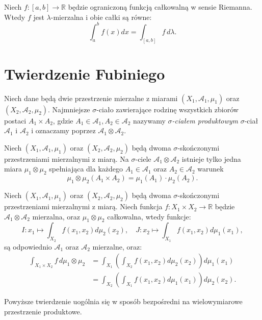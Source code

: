 	\begin{tw}
		Niech $f: [a,b] \rightarrow \mathbb{R}$ będzie ograniczoną funkcją całkowalną w sensie Riemanna. Wtedy $f$ jest $\lambda$-mierzalna i obie całki są równe:
		\begin{equation}
			\int_a^b f(x) dx = \int_{[a,b]}f \, d\lambda.
		\end{equation}
	\end{tw}
	\section{Twierdzenie Fubiniego}
	
	\begin{tw}
		Niech dane będą dwie przestrzenie mierzalne z miarami $(X_1, \mathcal{A}_1, \mu_1)$ oraz $(X_2, \mathcal{A}_2, \mu_2)$. Najmniejsze $\sigma$-ciało zawierające rodzinę wszystkich zbiorów postaci $A_1 \times A_2$, gdzie $A_1 \in \mathcal{A}_1, A_2 \in \mathcal{A}_2$ nazywamy \textit{$\sigma$-ciałem produktowym} $\sigma$-ciał $\mathcal{A}_1$ i $\mathcal{A}_2$ i  oznaczamy poprzez $\mathcal{A}_1 \otimes \mathcal{A}_2$.
	\end{tw}
	
	\begin{tw}
		Niech $(X_1, \mathcal{A}_1, \mu_1)$ oraz $(X_2, \mathcal{A}_2, \mu_2)$ będą dwoma $\sigma$-skończonymi przestrzeniami mierzalnymi z miarą. Na $\sigma$-ciele $\mathcal{A}_1 \otimes \mathcal{A}_2$ istnieje tylko jedna miara $\mu_1 \otimes \mu_2$ spełniająca dla każdego $A_1 \in \mathcal{A}_1$ oraz  $A_2 \in \mathcal{A}_2$ warunek
		\begin{equation}
			\mu_1 \otimes \mu_2(A_1 \times A_2) = \mu_1(A_1) \cdot \mu_2(A_2).
		\end{equation}
	\end{tw}
	
	\begin{tw}
		Niech $(X_1, \mathcal{A}_1, \mu_1)$ oraz $(X_2, \mathcal{A}_2, \mu_2)$ będą dwoma $\sigma$-skończonymi przestrzeniami mierzalnymi z miarą. Niech funkcja $f: X_1 \times X_2 \rightarrow \mathbb{R}$ będzie $\mathcal{A}_1 \otimes \mathcal{A}_2$ mierzalna, oraz $\mu_1 \otimes \mu_2$ całkowalna, wtedy funkcje:
		\begin{equation*}
			I: x_1 \mapsto \int_{X_2} f(x_1,x_2) d\mu_2(x_2), \quad J: x_2 \mapsto \int_{X_1} f(x_1,x_2) d\mu_1(x_1), 
		\end{equation*}
		są odpowiednio $\mathcal{A}_1$ oraz $\mathcal{A}_2$ mierzalne, oraz:
		\begin{align*}
			\int_{X_1 \times X_2} f \, d \mu_1 \otimes \mu_2 
			 &=  \int_{X_1} \left(  \int_{X_2} f(x_1,x_2) d\mu_2(x_2) \right) d\mu_1(x_1) \\
			 &=  \int_{X_2} \left(  \int_{X_1} f(x_1,x_2) d\mu_1(x_1) \right) d\mu_2(x_2). 
		\end{align*}
	\end{tw}
	Powyższe twierdzenie uogólnia się w sposób bezpośredni na wielowymiarowe przestrzenie produktowe.